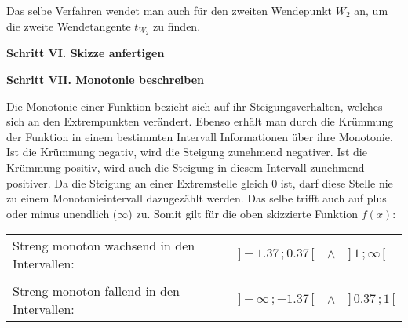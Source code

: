 Das selbe Verfahren wendet man auch f\"{u}r den zweiten Wendepunkt $W_{2}$ an, um die zweite Wendetangente $t_{W_{2}}$ zu finden.

\textbf{Schritt VI. Skizze anfertigen}

\begin{figure}[h!]
\end{figure}

\textbf{Schritt VII. Monotonie beschreiben}

Die Monotonie einer Funktion bezieht sich auf ihr Steigungsverhalten, welches sich an den Extrempunkten ver\"{a}ndert. Ebenso erh\"{a}lt man durch die Kr\"{u}mmung der Funktion in einem bestimmten Intervall Informationen \"{u}ber ihre Monotonie. Ist die Kr\"{u}mmung negativ, wird die Steigung zunehmend negativer. Ist die Kr\"{u}mmung positiv, wird auch die Steigung in diesem Intervall zunehmend positiver. Da die Steigung an einer Extremstelle gleich 0 ist, darf diese Stelle nie zu einem Monotonieintervall dazugez\"{a}hlt werden. Das selbe trifft auch auf plus oder minus unendlich ($\infty$) zu. Somit gilt f\"{u}r die oben skizzierte Funktion $f(x)$:

\begin{tabular}{l l l l}
	Streng monoton wachsend in den Intervallen: & $] -1.37\,; 0.37\,[$ & $\land$ & $]\, 1\,; \infty \, [$
	\\
	&&&
	\\
	Streng monoton fallend in den Intervallen: & $] -\infty\,; -1.37\,[$ & $\land$ & $] \, 0.37\,; 1 \, [$
\end{tabular}

\pagebreak

